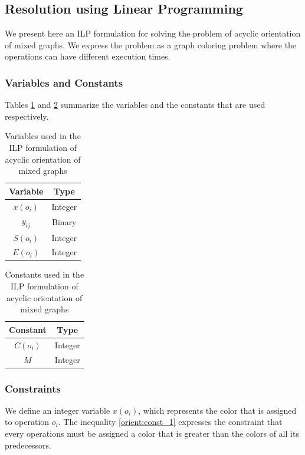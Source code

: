 \subsection{Resolution using Linear Programming}

We present here an ILP formulation for solving the problem of acyclic orientation of mixed graphs. We express the problem as a graph coloring problem where the operations can have different execution times. 

\subsubsection{Variables and Constants}

Tables \ref{table:varilporient} and \ref{table:consilporient} summarize the variables and the constants that are used respectively.

\begin{table}[!htbp]
\caption{Variables used in the ILP formulation of acyclic orientation of mixed graphs}
\centering
\label{table:varilporient}
\begin{tabular}{c c}
\toprule
Variable & Type   \\
\midrule
 $x(o_i)$ & Integer \\
 $y_{ij}$ & Binary \\
 $S(o_i)$ & Integer \\
 $E(o_i)$ & Integer \\
\bottomrule
\end{tabular}
\end{table}

\begin{table}[!htbp]
\caption{Constants used in the ILP formulation of acyclic orientation of mixed graphs}
\centering
\label{table:consilporient}
\begin{tabular}{c c}
\toprule
Constant & Type \\
\midrule
 $C(o_i)$ & Integer \\
 $M$ & Integer \\
\bottomrule
\end{tabular}
\end{table}

\subsubsection{Constraints}

We define an integer variable $x(o_i)$, which represents the color that is assigned to operation $o_i$. The inequality \ref{orient:const_1} expresses the constraint that every operations must be assigned a color that is greater than the colors of all its predecessors.

